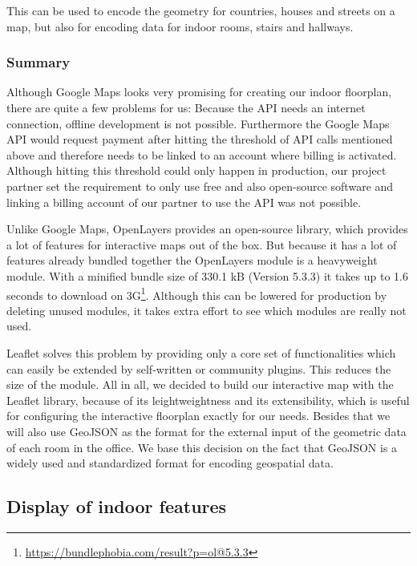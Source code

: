 This can be used to encode the geometry for countries, houses and streets on a map, but also for encoding data for indoor rooms, stairs and hallways.

\subsubsection{Summary}

Although Google Maps looks very promising for creating our indoor floorplan, there are quite a few problems for us: Because the API needs an internet connection, offline development is not possible. 
Furthermore the Google Maps API would request payment after hitting the threshold of API calls mentioned above and therefore needs to be linked to an account where billing is activated. Although hitting this threshold could only happen in production, our project partner set the requirement to only use free and also open-source software and linking a billing account of our partner to use the API was not possible. 

Unlike Google Maps, OpenLayers provides an open-source library, which provides a lot of features for interactive maps out of the box.
But because it has a lot of features already bundled together the OpenLayers module is a heavyweight module. With a minified bundle size of 330.1 kB (Version 5.3.3) it takes up to 1.6 seconds to download on 3G\footnote{\url{https://bundlephobia.com/result?p=ol@5.3.3}}. Although this can be lowered for production by deleting unused modules, it takes extra effort to see which modules are really not used.

Leaflet solves this problem by providing only a core set of functionalities which can easily be extended by self-written or community plugins. This reduces the size of the module. All in all, we decided to build our interactive map with the Leaflet library, because of its leightweightness and its extensibility, which is useful for configuring the interactive floorplan exactly for our needs. Besides that we will also use GeoJSON as the format for the external input of the geometric data of each room in the office. We base this decision on the fact that GeoJSON is a widely used and standardized format for encoding geospatial data.

\subsection{Display of indoor features}
\label{Display of indoor features}

